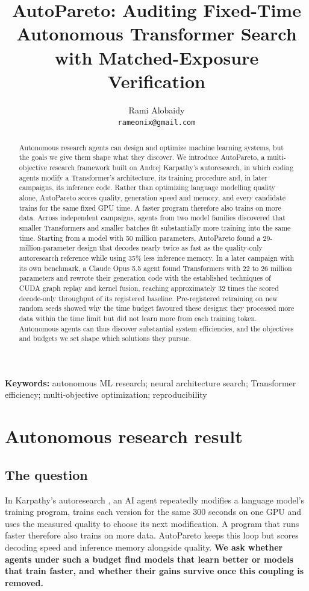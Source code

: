\documentclass{article}
\title{AutoPareto: Auditing Fixed-Time Autonomous Transformer Search\\with Matched-Exposure Verification}
\author{Rami Alobaidy\\ \texttt{rameonix@gmail.com}}
\begin{document}
\maketitle
\begin{abstract}
Autonomous research agents can design and optimize machine learning systems, but the goals we give them shape what they discover. We introduce AutoPareto, a multi-objective research framework built on Andrej Karpathy's autoresearch, in which coding agents modify a Transformer's architecture, its training procedure and, in later campaigns, its inference code. Rather than optimizing language modelling quality alone, AutoPareto scores quality, generation speed and memory, and every candidate trains for the same fixed GPU time. A faster program therefore also trains on more data. Across independent campaigns, agents from two model families discovered that smaller Transformers and smaller batches fit substantially more training into the same time. Starting from a model with 50 million parameters, AutoPareto found a 29-million-parameter design that decodes nearly twice as fast as the quality-only autoresearch reference while using 35\% less inference memory. In a later campaign with its own benchmark, a Claude Opus 5.5 agent found Transformers with 22 to 26 million parameters and rewrote their generation code with the established techniques of CUDA graph replay and kernel fusion, reaching approximately 32 times the scored decode-only throughput of its registered baseline. Pre-registered retraining on new random seeds showed why the time budget favoured these designs: they processed more data within the time limit but did not learn more from each training token. Autonomous agents can thus discover substantial system efficiencies, and the objectives and budgets we set shape which solutions they pursue.
\end{abstract}

\noindent\textbf{Keywords:} autonomous ML research; neural architecture search; Transformer efficiency; multi-objective optimization; reproducibility

\section{Autonomous research result}\label{partone}

\subsection{The question}\label{sec:question}
 In Karpathy's autoresearch \citep{autoresearch}, an AI agent repeatedly modifies a language model's training program, trains each version for the same 300 seconds on one GPU and uses the measured quality to choose its next modification. A program that runs faster therefore also trains on more data. AutoPareto keeps this loop but scores decoding speed and inference memory alongside quality. \textbf{We ask whether agents under such a budget find models that learn better or models that train faster, and whether their gains survive once this coupling is removed.}
\end{document}

